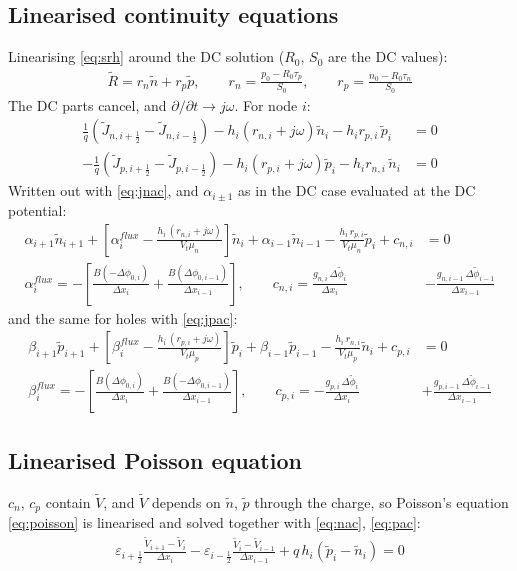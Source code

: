 \documentclass[11pt]{article}
\newcommand{\dphi}[1]{\Delta\phi_{#1}}
\newcommand{\half}{\tfrac{1}{2}}
\begin{document}
\subsection{Linearised continuity equations}
Linearising \eqref{eq:srh} around the DC solution ($R_0$, $S_0$ are the DC values):
\begin{align}
\tilde R=r_n\tilde n+r_p\tilde p,\qquad r_n=\frac{p_0-R_0\tau_p}{S_0},\qquad r_p=\frac{n_0-R_0\tau_n}{S_0}
\end{align}
The DC parts cancel, and $\partial/\partial t\to j\omega$. For node $i$:
\begin{align}
\frac1q\left(\tilde J_{n,i+\half}-\tilde J_{n,i-\half}\right)-h_i\left(r_{n,i}+j\omega\right)\tilde n_i-h_ir_{p,i}\,\tilde p_i&=0 \label{eq:nac}\\
-\frac1q\left(\tilde J_{p,i+\half}-\tilde J_{p,i-\half}\right)-h_i\left(r_{p,i}+j\omega\right)\tilde p_i-h_ir_{n,i}\,\tilde n_i&=0 \label{eq:pac}
\end{align}
Written out with \eqref{eq:jnac}, and $\alpha_{i\pm1}$ as in the DC case evaluated at the DC potential:
\begin{align}
\alpha_{i+1}\tilde n_{i+1}+\left[\alpha_i^{flux}-\frac{h_i\,(r_{n,i}+j\omega)}{V_t\mu_n}\right]\tilde n_i+\alpha_{i-1}\tilde n_{i-1}
-\frac{h_i\,r_{p,i}}{V_t\mu_n}\tilde p_i+c_{n,i}&=0\\
\alpha_i^{flux}=-\left[\frac{B(-\dphi{0,i})}{\Delta x_i}+\frac{B(\dphi{0,i-1})}{\Delta x_{i-1}}\right],\qquad
c_{n,i}=\frac{g_{n,i}\,\Delta\tilde\phi_i}{\Delta x_i}&-\frac{g_{n,i-1}\,\Delta\tilde\phi_{i-1}}{\Delta x_{i-1}}
\end{align}
and the same for holes with \eqref{eq:jpac}:
\begin{align}
\beta_{i+1}\tilde p_{i+1}+\left[\beta_i^{flux}-\frac{h_i\,(r_{p,i}+j\omega)}{V_t\mu_p}\right]\tilde p_i+\beta_{i-1}\tilde p_{i-1}
-\frac{h_i\,r_{n,i}}{V_t\mu_p}\tilde n_i+c_{p,i}&=0\\
\beta_i^{flux}=-\left[\frac{B(\dphi{0,i})}{\Delta x_i}+\frac{B(-\dphi{0,i-1})}{\Delta x_{i-1}}\right],\qquad
c_{p,i}=-\frac{g_{p,i}\,\Delta\tilde\phi_i}{\Delta x_i}&+\frac{g_{p,i-1}\,\Delta\tilde\phi_{i-1}}{\Delta x_{i-1}}
\end{align}

\subsection{Linearised Poisson equation}
$c_n$, $c_p$ contain $\tilde V$, and $\tilde V$ depends on $\tilde n$, $\tilde p$ through the charge, so
Poisson's equation \eqref{eq:poisson} is linearised and solved together with \eqref{eq:nac}, \eqref{eq:pac}:
\begin{align}
\varepsilon_{i+\half}\frac{\tilde V_{i+1}-\tilde V_i}{\Delta x_i}-\varepsilon_{i-\half}\frac{\tilde V_i-\tilde V_{i-1}}{\Delta x_{i-1}}
+q\,h_i\left(\tilde p_i-\tilde n_i\right)=0 \label{eq:poissonac}
\end{align}
\end{document}
